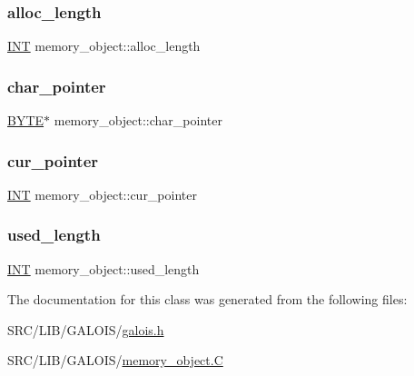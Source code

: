 \subsubsection{\texorpdfstring{alloc\+\_\+length}{alloc\_length}}
{\footnotesize\ttfamily \mbox{\hyperlink{galois_8h_a09fddde158a3a20bd2dcadb609de11dc}{I\+NT}} memory\+\_\+object\+::alloc\+\_\+length}

\mbox{\label{classmemory__object_a2ed98d96dff407dcea840fe10da49dd4}} 
\subsubsection{\texorpdfstring{char\+\_\+pointer}{char\_pointer}}
{\footnotesize\ttfamily \mbox{\hyperlink{galois_8h_ab6cc7b4aeb6ea31aba2b3fbfc83ff5e6}{B\+Y\+TE}}$\ast$ memory\+\_\+object\+::char\+\_\+pointer}

\mbox{\label{classmemory__object_a52ad3daf2b67e1fdfb413f9ffe38fbb7}} 
\subsubsection{\texorpdfstring{cur\+\_\+pointer}{cur\_pointer}}
{\footnotesize\ttfamily \mbox{\hyperlink{galois_8h_a09fddde158a3a20bd2dcadb609de11dc}{I\+NT}} memory\+\_\+object\+::cur\+\_\+pointer}

\mbox{\label{classmemory__object_a7deeb1452089f3a16dfb9da259f3e4ae}} 
\subsubsection{\texorpdfstring{used\+\_\+length}{used\_length}}
{\footnotesize\ttfamily \mbox{\hyperlink{galois_8h_a09fddde158a3a20bd2dcadb609de11dc}{I\+NT}} memory\+\_\+object\+::used\+\_\+length}



The documentation for this class was generated from the following files\+:\begin{DoxyCompactItemize}
\item 
S\+R\+C/\+L\+I\+B/\+G\+A\+L\+O\+I\+S/\mbox{\hyperlink{galois_8h}{galois.\+h}}\item 
S\+R\+C/\+L\+I\+B/\+G\+A\+L\+O\+I\+S/\mbox{\hyperlink{memory__object_8_c}{memory\+\_\+object.\+C}}\end{DoxyCompactItemize}

